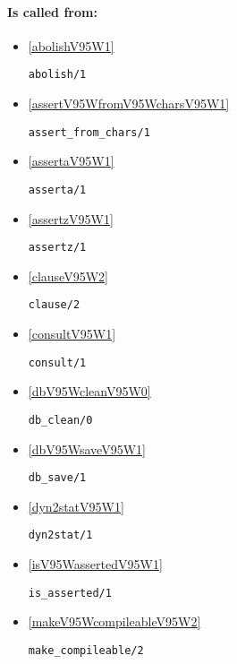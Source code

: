 \paragraph{Is called from:} 
\begin{itemize}
\item \ref{abolishV95W1} 
\begin{verbatim}
abolish/1
\end{verbatim}

\item \ref{assertV95WfromV95WcharsV95W1} 
\begin{verbatim}
assert_from_chars/1
\end{verbatim}

\item \ref{assertaV95W1} 
\begin{verbatim}
asserta/1
\end{verbatim}

\item \ref{assertzV95W1} 
\begin{verbatim}
assertz/1
\end{verbatim}

\item \ref{clauseV95W2} 
\begin{verbatim}
clause/2
\end{verbatim}

\item \ref{consultV95W1} 
\begin{verbatim}
consult/1
\end{verbatim}

\item \ref{dbV95WcleanV95W0} 
\begin{verbatim}
db_clean/0
\end{verbatim}

\item \ref{dbV95WsaveV95W1} 
\begin{verbatim}
db_save/1
\end{verbatim}

\item \ref{dyn2statV95W1} 
\begin{verbatim}
dyn2stat/1
\end{verbatim}

\item \ref{isV95WassertedV95W1} 
\begin{verbatim}
is_asserted/1
\end{verbatim}

\item \ref{makeV95WcompileableV95W2} 
\begin{verbatim}
make_compileable/2
\end{verbatim}


\end{itemize}
